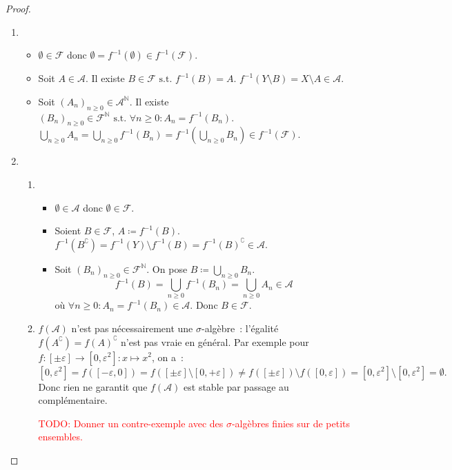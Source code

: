 \documentclass{article}
\theoremstyle{definition}
\newcommand{\TODO}[1]{\textcolor{red}{TODO: #1}}
\newcommand{\st}{\text{ s.t. }}
\newcommand{\C}{\complement}
\newcommand{\N}{{\mathbb N}}
\begin{document}
\begin{proof}~
\begin{enumerate}
	\item~
	\begin{itemize}
		\item $\emptyset \in \mathcal F$ donc $\emptyset = f^{-1}(\emptyset) \in f^{-1}(\mathcal F)$.
		\item Soit $A \in \mathcal A$. Il existe $B \in \mathcal F \st f^{-1}(B) = A$. $f^{-1}(Y \setminus B) = X \setminus A \in \mathcal A$.
		\item Soit $(A_n)_{n \geq 0} \in \mathcal A^\N$. Il existe $(B_n)_{n \geq 0} \in \mathcal F^\N \st \forall n \geq 0 : A_n = f^{-1}(B_n)$.
		$\bigcup_{n \geq 0}A_n = \bigcup_{n \geq 0}f^{-1}(B_n) = f^{-1}\left(\bigcup_{n \geq 0}B_n\right) \in f^{-1}(\mathcal F)$.
	\end{itemize}
	\item~
	\begin{enumerate}
		\item~
		\begin{itemize}
			\item $\emptyset \in \mathcal A$ donc $\emptyset \in \mathcal F$.
			\item Soient $B \in \mathcal F$, $A \coloneqq f^{-1}(B)$. $f^{-1}(B^\C) = f^{-1}(Y) \setminus f^{-1}(B) = f^{-1}(B)^\C \in \mathcal A$.
			\item Soit $(B_n)_{n \geq 0} \in \mathcal F^\N$. On pose $B \coloneqq \bigcup_{n \geq 0}B_n$.
			\[f^{-1}(B) = \bigcup_{n \geq 0}f^{-1}(B_n) = \bigcup_{n \geq 0}A_n \in \mathcal A\]
			où $\forall n \geq 0 : A_n = f^{-1}(B_n) \in \mathcal A$. Donc $B \in \mathcal F$.
		\end{itemize}
		\item $f(\mathcal A)$ n'est pas nécessairement une $\sigma$-algèbre~: l'égalité $f(A^\C) = f(A)^\C$ n'est pas vraie en général. Par exemple pour
		$f : [\pm\varepsilon] \to [0, \varepsilon^2] : x \mapsto x^2$, on a~:
		\[[0, \varepsilon^2] = f([-\varepsilon, 0]) = f([\pm\varepsilon] \setminus [0, +\varepsilon])
		  \neq f([\pm\varepsilon]) \setminus f([0, \varepsilon]) = [0, \varepsilon^2] \setminus [0, \varepsilon^2] = \emptyset.\]
		Donc rien ne garantit que $f(\mathcal A)$ est stable par passage au complémentaire.

		\TODO{Donner un contre-exemple avec des $\sigma$-algèbres finies sur de petits ensembles.}
	\end{enumerate}
\end{enumerate}
\end{proof}
\end{document}
